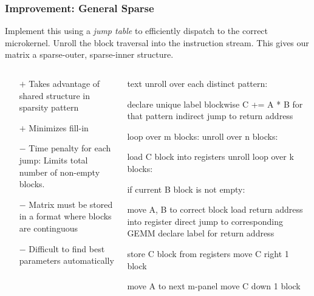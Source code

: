 \documentclass[9pt]{beamer}
\begin{document}
\begin{frame}[fragile]
  \frametitle{Improvement: General Sparse}
  Implement this using a \emph{jump table} to efficiently dispatch to the correct microkernel. Unroll the block traversal into the instruction stream. This gives our matrix a sparse-outer, sparse-inner structure.


  \begin{columns}[t]%
    \begin{column}{0.4\textwidth}
      \begin{itemize}
  \item[$+$] Takes advantage of shared structure in sparsity pattern
  \item[$+$] Minimizes fill-in

  \item[$-$] Time penalty for each jump: Limits total number of non-empty blocks.
  \item[$-$] Matrix must be stored in a format where blocks are continguous
  \item[$-$] Difficult to find best parameters automatically
      \end{itemize}
    \end{column}
    \begin{column}{0.6\textwidth}
      \begin{ccode}[]
        {text}
        unroll over each distinct pattern:

           declare unique label
           blockwise C += A * B for that pattern
           indirect jump to return address

        loop over m blocks:
           unroll over n blocks:

              load C block into registers
              unroll loop over k blocks:

                 if current B block is not empty:

                    move A, B to correct block
                    load return address into register
                    direct jump to corresponding GEMM
                    declare label for return address

              store C block from registers
              move C right 1 block

           move A to next m-panel
           move C down 1 block
      \end{ccode}
    \end{column}
  \end{columns}

\end{frame}
\end{document}
